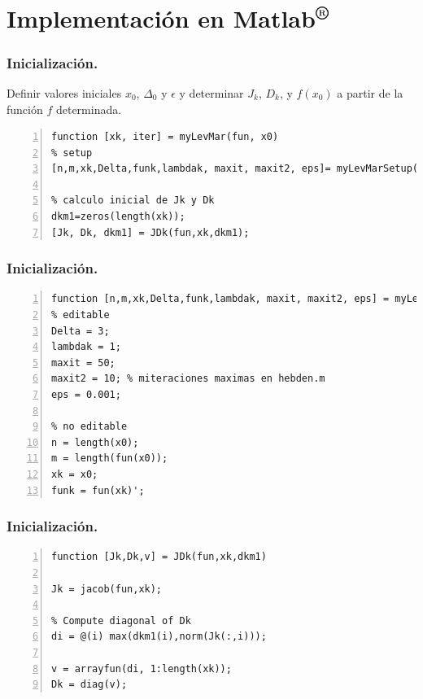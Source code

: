 \documentclass{beamer}
\begin{document}
\section{Implementación en Matlab\textsuperscript{®}}


\begin{frame}[fragile]
    \frametitle{Inicialización.}
    \begin{steps}
        \item Definir valores iniciales $x_0$, $\Delta_0$ y $\epsilon$ y determinar $J_k$, $D_k$, y $f(x_0)$ a partir de la función $f$ determinada.
    \end{steps} \pause
    \vspace{0.5cm}
\begin{lstlisting}[frame=single, numbers=left, style=Matlab-editor]
function [xk, iter] = myLevMar(fun, x0)
% setup
[n,m,xk,Delta,funk,lambdak, maxit, maxit2, eps]= myLevMarSetup(fun,x0);

% calculo inicial de Jk y Dk
dkm1=zeros(length(xk));
[Jk, Dk, dkm1] = JDk(fun,xk,dkm1);
\end{lstlisting}
        
\end{frame}

\begin{frame}[fragile]
    \frametitle{Inicialización.}
\begin{lstlisting}[frame=single, numbers=left, style=Matlab-editor]
function [n,m,xk,Delta,funk,lambdak, maxit, maxit2, eps] = myLevMarSetup(fun,x0)
% editable
Delta = 3;
lambdak = 1; 
maxit = 50;
maxit2 = 10; % miteraciones maximas en hebden.m
eps = 0.001;

% no editable
n = length(x0);
m = length(fun(x0));
xk = x0;
funk = fun(xk)';
\end{lstlisting}
        
\end{frame}

\begin{frame}[fragile]
    \frametitle{Inicialización.}
\begin{lstlisting}[frame=single, numbers=left, style=Matlab-editor]
function [Jk,Dk,v] = JDk(fun,xk,dkm1)

Jk = jacob(fun,xk);

% Compute diagonal of Dk
di = @(i) max(dkm1(i),norm(Jk(:,i)));

v = arrayfun(di, 1:length(xk));
Dk = diag(v);
\end{lstlisting}
        
\end{frame}
\end{document}
